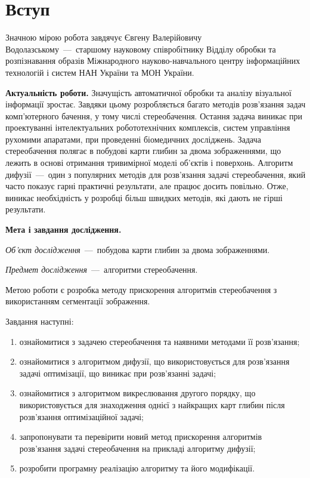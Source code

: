 \chapter*{Вступ}

Значною мірою робота завдячує Євгену Валерійовичу Водолазському~---~старшому
науковому співробітнику Відділу обробки та розпізнавання образів
Міжнародного науково-навчального центру інформаційних технологій
і систем НАН України та МОН України.

\textbf{Актуальність роботи.}
Значущість автоматичної обробки та аналізу візуальної інформації зростає.
Завдяки цьому розробляється багато методів
розв'язання задач комп'ютерного бачення, у тому числі стереобачення.
Остання задача виникає при проектуванні інтелектуальних робототехнічних
комплексів, систем управління рухомими апаратами,
при проведенні біомедичних досліджень.
Задача стереобачення полягає в побудові карти глибин за двома зображеннями,
що лежить в основі отримання тривимірної моделі об'єктів і поверхонь.
Алгоритм дифузії~---~один з популярних методів для розв'язання задачі
стереобачення, який часто показує гарні практичні результати,
але працює досить повільно.
Отже, виникає необхідність у розробці більш швидких методів,
які дають не гірші результати.

\textbf{Мета і завдання дослідження.}

\textit{Об'єкт дослідження}~---~побудова карти глибин за двома зображеннями.

\textit{Предмет дослідження}~---~алгоритми стереобачення.

Метою роботи є розробка методу прискорення алгоритмів стереобачення
з використанням сегментації зображення.

Завдання наступні:
\begin{enumerate}
  \item
    ознайомитися з задачею стереобачення та наявними методами її розв'язання;
  \item
    ознайомитися з алгоритмом дифузії,
    що використовується для розв'язання задачі оптимізації,
    що виникає при розв'язанні задачі;
  \item
    ознайомитися з алгоритмом викреслювання другого порядку,
    що використовується для знаходження однієї з найкращих карт глибин
    після розв'язання оптимізаційної задачі;
  \item
    запропонувати та перевірити новий метод прискорення
    алгоритмів розв'язання задачі стереобачення на прикладі алгоритму дифузії;
  \item
    розробити програмну реалізацію алгоритму та його модифікації.
\end{enumerate}

